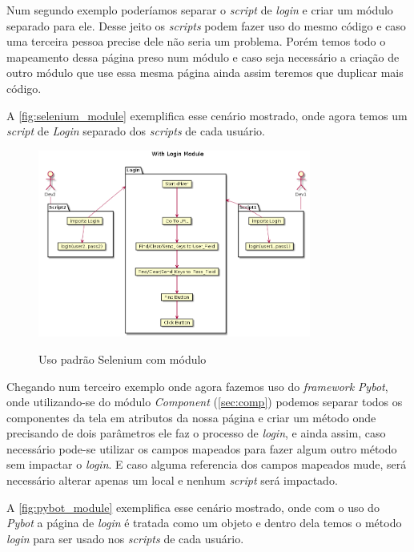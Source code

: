     Num segundo exemplo poderíamos separar o \textit{script} de \textit{login} e criar um módulo separado para ele. Desse jeito
    os \textit{scripts} podem fazer uso do mesmo código e caso uma terceira pessoa precise dele não seria um problema.
    Porém temos todo o mapeamento dessa página preso num módulo e caso seja necessário a criação de outro
    módulo que use essa mesma página ainda assim teremos que duplicar mais código.

    A \autoref{fig:selenium_module} exemplifica esse cenário mostrado, onde agora temos um \textit{script} de \textit{Login}
    separado dos \textit{scripts} de cada usuário.

    \begin{figure}[h]
        \vspace*{0,3cm}
        \centering
        \caption{Uso padrão Selenium com módulo}
        \includegraphics[width=0.8\textwidth]{./04-figuras/page_object_module}
        \label{fig:selenium_module}
    \end{figure}


    Chegando num terceiro exemplo onde agora fazemos uso do \textit{framework} \textit{Pybot}, onde utilizando-se do
    módulo \textit{Component} (\autoref{sec:comp}) podemos separar todos os componentes da tela em atributos da nossa página
    e criar um método onde precisando de dois parâmetros ele faz o processo de \textit{login}, e ainda assim, caso
    necessário pode-se utilizar os campos mapeados para fazer algum outro método sem impactar o \textit{login}.
    E caso alguma referencia dos campos mapeados mude, será necessário alterar apenas um local e nenhum \textit{script}
    será impactado.

    A \autoref{fig:pybot_module} exemplifica esse cenário mostrado, onde com o uso do \textit{Pybot} a página de \textit{login}
    é tratada como um objeto e dentro dela temos o método \textit{login} para ser usado nos \textit{scripts} de cada usuário.

